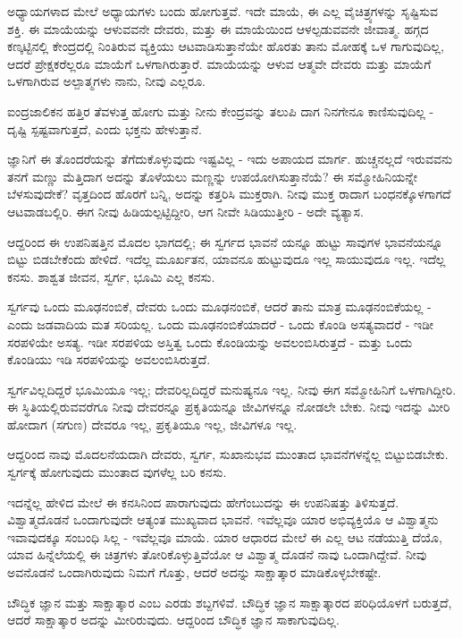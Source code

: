 ಅಧ್ಯಾಯಗಳಾದ ಮೇಲೆ ಅಧ್ಯಾಯಗಳು ಬಂದು ಹೋಗುತ್ತವೆ. ಇದೇ ಮಾಯೆ, ಈ ಎಲ್ಲ ವೈಚಿತ್ರ್ಯಗಳನ್ನು ಸೃಷ್ಟಿಸುವ ಶಕ್ತಿ. ಈ ಮಾಯೆಯನ್ನು ಆಳುವವನೇ ದೇವರು, ಮತ್ತು ಈ ಮಾಯೆಯಿಂದ ಆಳಲ್ಪಡುವವನೇ ಜೀವಾತ್ಮ. ಹಗ್ಗದ ಕಣ್ಕಟ್ಟಿನಲ್ಲಿ ಕೇಂದ್ರದಲ್ಲಿ ನಿಂತಿರುವ ವ್ಯಕ್ತಿಯು ಆಟವಾಡಿಸುತ್ತಾನೆಯೇ ಹೊರತು ತಾನು ಮೋಹಕ್ಕೆ ಒಳ ಗಾಗುವುದಿಲ್ಲ, ಆದರೆ ಪ್ರೇಕ್ಷಕರೆಲ್ಲರೂ ಮಾಯೆಗೆ ಒಳಗಾಗಿರುತ್ತಾರೆ. ಮಾಯೆಯನ್ನು ಆಳುವ ಆತ್ಮವೇ ದೇವರು ಮತ್ತು ಮಾಯೆಗೆ ಒಳಗಾಗಿರುವ ಅಲ್ಪಾತ್ಮಗಳು ನಾನು, ನೀವು ಎಲ್ಲರೂ.

ಐಂದ್ರಜಾಲಿಕನ ಹತ್ತಿರ ತೆವಳುತ್ತ ಹೋಗು ಮತ್ತು ನೀನು ಕೇಂದ್ರವನ್ನು ತಲುಪಿ ದಾಗ ನಿನಗೇನೂ ಕಾಣಿಸುವುದಿಲ್ಲ - ದೃಷ್ಟಿ ಸ್ಪಷ್ಟವಾಗುತ್ತದೆ, ಎಂದು ಭಕ್ತನು ಹೇಳುತ್ತಾನೆ.

ಜ್ಞಾನಿಗೆ ಈ ತೊಂದರೆಯನ್ನು ತೆಗೆದುಕೊಳ್ಳುವುದು ಇಷ್ಟವಿಲ್ಲ - ಇದು ಅಪಾಯದ ಮಾರ್ಗ. ಹುಚ್ಚನಲ್ಲದೆ ಇರುವವನು ತನಗೆ ಮಣ್ಣು ಮೆತ್ತಿದಾಗ ಅದನ್ನು ತೊಳೆಯಲು ಮಣ್ಣನ್ನು ಉಪಯೋಗಿಸುತ್ತಾನೆಯೆ? ಈ ಸಮ್ಮೋಹಿನಿಯನ್ನೇ ಬೆಳಸುವುದೇಕೆ? ವೃತ್ತದಿಂದ ಹೊರಗೆ ಬನ್ನಿ, ಅದನ್ನು ಕತ್ತರಿಸಿ ಮುಕ್ತರಾಗಿ. ನೀವು ಮುಕ್ತ ರಾದಾಗ ಬಂಧನಕ್ಕೊಳಗಾಗದೆ ಆಟವಾಡಬಲ್ಲಿರಿ. ಈಗ ನೀವು ಹಿಡಿಯಲ್ಪಟ್ಟಿದ್ದೀರಿ, ಆಗ ನೀವೇ ಸಿಡಿಯುತ್ತೀರಿ - ಅದೇ ವ್ಯತ್ಯಾಸ.

ಆದ್ದರಿಂದ ಈ ಉಪನಿಷತ್ತಿನ ಮೊದಲ ಭಾಗದಲ್ಲಿ; ಈ ಸ್ವರ್ಗದ ಭಾವನೆ ಯನ್ನೂ ಹುಟ್ಟು ಸಾವುಗಳ ಭಾವನೆಯನ್ನೂ ಬಿಟ್ಟು ಬಿಡಬೇಕೆಂದು ಹೇಳಿದೆ. ಇದೆಲ್ಲ ಮೂರ್ಖತನ, ಯಾವನೂ ಹುಟ್ಟುವುದೂ ಇಲ್ಲ ಸಾಯುವುದೂ ಇಲ್ಲ. ಇದೆಲ್ಲ ಕನಸು. ಶಾಶ್ವತ ಜೀವನ, ಸ್ವರ್ಗ, ಭೂಮಿ ಎಲ್ಲ ಕನಸು.

ಸ್ವರ್ಗವು ಒಂದು ಮೂಢನಂಬಿಕೆ, ದೇವರು ಒಂದು ಮೂಢನಂಬಿಕೆ, ಆದರೆ ತಾನು ಮಾತ್ರ ಮೂಢನಂಬಿಕೆಯಲ್ಲ - ಎಂದು ಜಡವಾದಿಯ ಮತ ಸರಿಯಲ್ಲ. ಒಂದು ಮೂಢನಂಬಿಕೆಯಾದರೆ - ಒಂದು ಕೊಂಡಿ ಅಸತ್ಯವಾದರೆ - ಇಡೀ ಸರಪಳಿಯೇ ಅಸತ್ಯ. ಇಡೀ ಸರಪಳಿಯ ಅಸ್ತಿತ್ವ ಒಂದು ಕೊಂಡಿಯನ್ನು ಅವಲಂಬಿಸಿರುತ್ತದೆ - ಮತ್ತು ಒಂದು ಕೊಂಡಿಯು ಇಡಿ ಸರಪಳಿಯನ್ನು ಅವಲಂಬಿಸಿರುತ್ತದೆ.

ಸ್ವರ್ಗವಿಲ್ಲದಿದ್ದರೆ ಭೂಮಿಯೂ ಇಲ್ಲ; ದೇವರಿಲ್ಲದಿದ್ದರೆ ಮನುಷ್ಯನೂ ಇಲ್ಲ. ನೀವು ಈಗ ಸಮ್ಮೋಹಿನಿಗೆ ಒಳಗಾಗಿದ್ದೀರಿ. ಈ ಸ್ಥಿತಿಯಲ್ಲಿರುವವರೆಗೂ ನೀವು ದೇವರನ್ನೂ ಪ್ರಕೃತಿಯನ್ನೂ ಜೀವಿಗಳನ್ನೂ ನೋಡಲೇ ಬೇಕು. ನೀವು ಇದನ್ನು ಮೀರಿ ಹೋದಾಗ (ಸಗುಣ) ದೇವರೂ ಇಲ್ಲ, ಪ್ರಕೃತಿಯೂ ಇಲ್ಲ, ಜೀವಿಗಳೂ ಇಲ್ಲ.

ಆದ್ದರಿಂದ ನಾವು ಮೊದಲನೆಯದಾಗಿ ದೇವರು, ಸ್ವರ್ಗ, ಸುಖಾನುಭವ ಮುಂತಾದ ಭಾವನೆಗಳನ್ನೆಲ್ಲ ಬಿಟ್ಟುಬಿಡಬೇಕು. ಸ್ವರ್ಗಕ್ಕೆ ಹೋಗುವುದು ಮುಂತಾದ ವುಗಳೆಲ್ಲ ಬರಿ ಕನಸು.

ಇದನ್ನೆಲ್ಲ ಹೇಳಿದ ಮೇಲೆ ಈ ಕನಸಿನಿಂದ ಪಾರಾಗುವುದು ಹೇಗೆಂಬುದನ್ನು ಈ ಉಪನಿಷತ್ತು ತಿಳಿಸುತ್ತದೆ. ವಿಶ್ವಾತ್ಮದೊಡನೆ ಒಂದಾಗುವುದೇ ಆತ್ಯಂತ ಮುಖ್ಯವಾದ ಭಾವನೆ. ಇವೆಲ್ಲವೂ ಯಾರ ಅಭಿವ್ಯಕ್ತಿಯೊ ಆ ವಿಶ್ವಾತ್ಮನು ಇವಾವುದಕ್ಕೂ ಸಂಬಂಧಿ ಸಿಲ್ಲ - ಇವೆಲ್ಲವೂ ಮಾಯೆ. ಯಾರ ಆಧಾರದ ಮೇಲೆ ಈ ಎಲ್ಲ ಆಟ ನಡೆಯುತ್ತಿ ದೆಯೊ, ಯಾವ ಹಿನ್ನೆಲೆಯಲ್ಲಿ ಈ ಚಿತ್ರಗಳು ತೋರಿಕೊಳ್ಳುತ್ತಿವೆಯೋ ಆ ವಿಶ್ವಾತ್ಮ ದೊಡನೆ ನಾವು ಒಂದಾಗಿದ್ದೇವೆ. ನೀವು ಅವನೊಡನೆ ಒಂದಾಗಿರುವುದು ನಿಮಗೆ ಗೊತ್ತು, ಆದರೆ ಅದನ್ನು ಸಾಕ್ಷಾತ್ಕಾರ ಮಾಡಿಕೊಳ್ಳಬೇಕಷ್ಟೇ.

ಬೌದ್ಧಿಕ ಜ್ಞಾನ ಮತ್ತು ಸಾಕ್ಷಾತ್ಕಾರ ಎಂಬ ಎರಡು ಶಬ್ದಗಳಿವೆ. ಬೌದ್ಧಿಕ ಜ್ಞಾನ ಸಾಕ್ಷಾತ್ಕಾರದ ಪರಿಧಿಯೊಳಗೆ ಬರುತ್ತದೆ, ಆದರೆ ಸಾಕ್ಷಾತ್ಕಾರ ಅದನ್ನು ಮೀರಿರುವುದು. ಆದ್ದರಿಂದ ಬೌದ್ಧಿಕ ಜ್ಞಾನ ಸಾಕಾಗುವುದಿಲ್ಲ.

